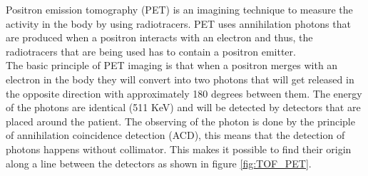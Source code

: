 \documentclass[twoside,english]{uiofysmaster/uiofysmaster}
\begin{document}
Positron emission tomography (PET) is an imagining technique to measure the activity in the body by using radiotracers\cite{molecular_imaging}. PET uses annihilation photons that are produced when a positron interacts with an electron and thus, the radiotracers that are being used has to contain a positron emitter. \\
The basic principle of PET imaging is that when a positron merges with an electron in the body they will convert into two photons that will get released in the opposite direction with approximately 180 degrees between them\cite{physics_in_medicine}. The energy of the photons are identical (511 KeV) and will be detected by detectors that are placed around the patient. The observing of the photon is done by the principle of annihilation coincidence detection (ACD), this means that the detection of photons happens without collimator. This makes it possible to find their origin along a line between the detectors\cite{physics_in_medicine} as shown in figure \ref{fig:TOF_PET}.\\
\\
\end{document}

